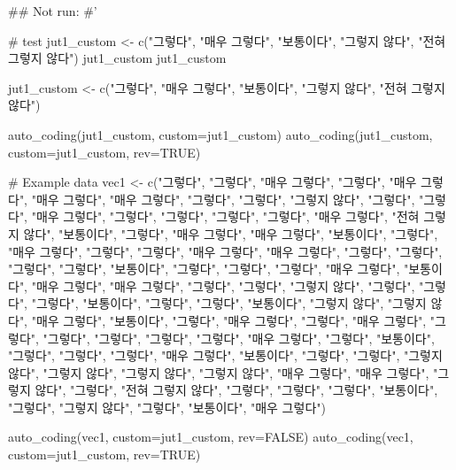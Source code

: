 \documentclass[a4paper]{book}
\begin{document}
\begin{Examples}
\begin{ExampleCode}

## Not run: 
#'

# test
jut1_custom <- c("그렇다", "매우 그렇다", "보통이다",
                 "그렇지 않다", "전혀 그렇지 않다")
jut1_custom
jut1_custom%


jut1_custom <- c("그렇다", "매우 그렇다", "보통이다", "그렇지 않다", "전혀 그렇지 않다")

auto_coding(jut1_custom, custom=jut1_custom)
auto_coding(jut1_custom, custom=jut1_custom, rev=TRUE)


# Example data
vec1 <- c("그렇다", "그렇다", "매우 그렇다", "그렇다", "매우 그렇다", "매우 그렇다",
          "매우 그렇다", "그렇다", "그렇다", "그렇지 않다", "그렇다", "그렇다",
          "매우 그렇다", "그렇다", "그렇다", "그렇다", "그렇다", "매우 그렇다",
          "전혀 그렇지 않다", "보통이다", "그렇다", "매우 그렇다", "매우 그렇다",
          "보통이다", "그렇다", "매우 그렇다", "그렇다", "그렇다", "매우 그렇다",
          "매우 그렇다", "그렇다", "그렇다", "그렇다", "그렇다", "보통이다",
          "그렇다", "그렇다", "그렇다", "매우 그렇다", "보통이다", "매우 그렇다",
          "매우 그렇다", "그렇다", "그렇다", "그렇지 않다", "그렇다", "그렇다",
          "그렇다", "보통이다", "그렇다", "그렇다", "보통이다", "그렇지 않다",
          "그렇지 않다", "매우 그렇다", "보통이다", "그렇다", "매우 그렇다",
          "그렇다", "매우 그렇다", "그렇다", "그렇다", "그렇다", "그렇다",
          "그렇다", "매우 그렇다", "그렇다", "보통이다", "그렇다", "그렇다",
          "그렇다", "매우 그렇다", "보통이다", "그렇다", "그렇다", "그렇지 않다",
          "그렇지 않다", "그렇지 않다", "그렇지 않다", "매우 그렇다", "매우 그렇다",
          "그렇지 않다", "그렇다", "전혀 그렇지 않다", "그렇다", "그렇다",
          "그렇다", "보통이다", "그렇다", "그렇지 않다", "그렇다", "보통이다",
          "매우 그렇다")

auto_coding(vec1, custom=jut1_custom, rev=FALSE)
auto_coding(vec1, custom=jut1_custom, rev=TRUE)




\end{ExampleCode}
\end{Examples}
\end{document}
